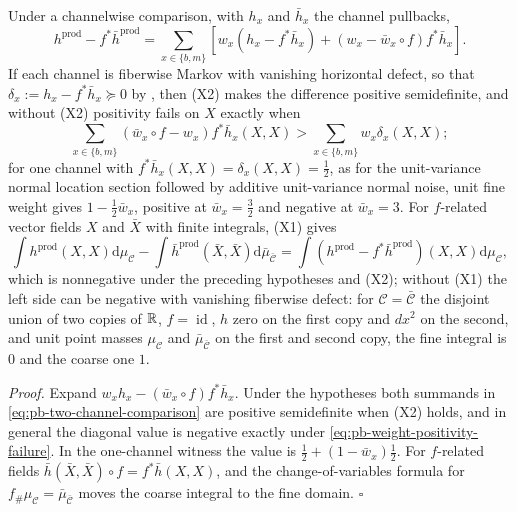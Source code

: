 Under a channelwise comparison, with \(h_x\) and \(\bar h_x\) the channel pullbacks,
\begin{equation}
h^{\mathrm{prod}}-f^*\bar h^{\mathrm{prod}}
=\sum_{x\in\{b,m\}}
\left[
w_x\left(h_x-f^*\bar h_x\right)
+\left(w_x-\bar w_x\circ f\right)f^*\bar h_x
\right].
\label{eq:pb-two-channel-comparison}
\end{equation}
If each channel is fiberwise Markov with vanishing horizontal defect, so that
\(\delta_x:=h_x-f^*\bar h_x\succeq0\) by , then (X2) makes the
difference positive semidefinite, and without (X2) positivity fails on \(X\) exactly when
\begin{equation}
\sum_{x\in\{b,m\}}(\bar w_x\circ f-w_x)f^*\bar h_x(X,X)
>\sum_{x\in\{b,m\}}w_x\delta_x(X,X);
\label{eq:pb-weight-positivity-failure}
\end{equation}
for one channel with \(f^*\bar h_x(X,X)=\delta_x(X,X)=\tfrac12\), as for the unit-variance normal
location section followed by additive unit-variance normal noise, unit fine weight gives
\(1-\tfrac12\bar w_x\), positive at \(\bar w_x=\tfrac32\) and negative at \(\bar w_x=3\). For
\(f\)-related vector fields \(X\) and \(\bar X\) with finite integrals, (X1) gives
\[
\int h^{\mathrm{prod}}(X,X)\mathrm d\mu_{\mathcal C}-\int\bar h^{\mathrm{prod}}(\bar X,\bar X)\mathrm d\bar\mu_{\bar{\mathcal C}}
=\int(h^{\mathrm{prod}}-f^*\bar h^{\mathrm{prod}})(X,X)\mathrm d\mu_{\mathcal C},
\]
which is nonnegative under the preceding hypotheses and (X2); without (X1) the left side can be
negative with vanishing fiberwise defect: for \(\mathcal C=\bar{\mathcal C}\) the disjoint union of two
copies of \(\mathbb R\), \(f=\operatorname{id}\), \(h\) zero on the first copy and \(dx^2\) on the second, and
unit point masses \(\mu_{\mathcal C}\) and \(\bar\mu_{\bar{\mathcal C}}\) on the first and second copy,
the fine integral is \(0\) and the coarse one \(1\). 

\noindent\emph{Proof.}
Expand \(w_xh_x-(\bar w_x\circ f)f^*\bar h_x\). Under the hypotheses both summands in
\eqref{eq:pb-two-channel-comparison} are positive semidefinite when (X2) holds, and in general the
diagonal value is negative exactly under \eqref{eq:pb-weight-positivity-failure}. In the one-channel
witness the value is \(\tfrac12+(1-\bar w_x)\tfrac12\). For \(f\)-related fields
\(\bar h(\bar X,\bar X)\circ f=f^*\bar h(X,X)\), and the change-of-variables formula for
\(f_\#\mu_{\mathcal C}=\bar\mu_{\bar{\mathcal C}}\) moves the coarse integral to the fine domain.
\hfill$\square$

